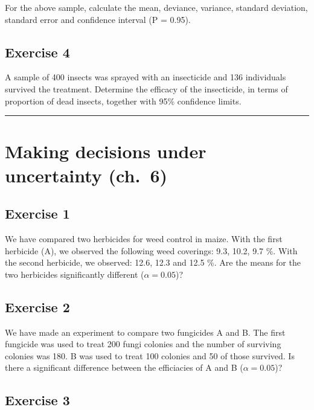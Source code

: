 \documentclass[a4paper,12pt,oneside]{book}
\begin{document}
For the above sample, calculate the mean, deviance, variance, standard deviation, standard error and confidence interval (P = 0.95).

\hypertarget{exercise-4-1}{%
\subsection{Exercise 4}\label{exercise-4-1}}

A sample of 400 insects was sprayed with an insecticide and 136 individuals survived the treatment. Determine the efficacy of the insecticide, in terms of proportion of dead insects, together with 95\% confidence limits.

\begin{center}\rule{0.5\linewidth}{0.5pt}\end{center}

\hypertarget{making-decisions-under-uncertainty-ch.-6}{%
\section{Making decisions under uncertainty (ch.~6)}\label{making-decisions-under-uncertainty-ch.-6}}

\hypertarget{exercise-1-4}{%
\subsection{Exercise 1}\label{exercise-1-4}}

We have compared two herbicides for weed control in maize. With the first herbicide (A), we observed the following weed coverings: 9.3, 10.2, 9.7 \%. With the second herbicide, we observed: 12.6, 12.3 and 12.5 \%. Are the means for the two herbicides significantly different (\(\alpha = 0.05\))?

\hypertarget{exercise-2-4}{%
\subsection{Exercise 2}\label{exercise-2-4}}

We have made an experiment to compare two fungicides A and B. The first fungicide was used to treat 200 fungi colonies and the number of surviving colonies was 180. B was used to treat 100 colonies and 50 of those survived. Is there a significant difference between the efficiacies of A and B (\(\alpha = 0.05\))?

\hypertarget{exercise-3-4}{%
\subsection{Exercise 3}\label{exercise-3-4}}
\end{document}
